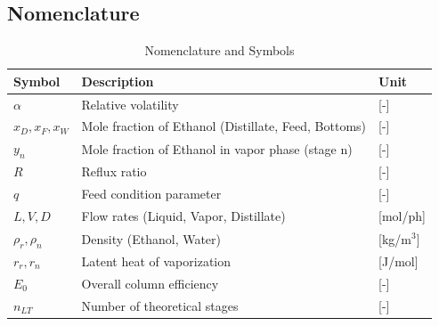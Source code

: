 \subsection{Nomenclature}

\begin{table}[H]
    \centering
    \caption{Nomenclature and Symbols}
    \begin{tabular}{lll}
        \toprule
        \textbf{Symbol}  & \textbf{Description}                                 & \textbf{Unit} \\
        \midrule
        $\alpha$         & Relative volatility                                  & [-]           \\
        $x_D, x_F, x_W$  & Mole fraction of Ethanol (Distillate, Feed, Bottoms) & [-]           \\
        $y_n$            & Mole fraction of Ethanol in vapor phase (stage n)    & [-]           \\
        $R$              & Reflux ratio                                         & [-]           \\
        $q$              & Feed condition parameter                             & [-]           \\
        $L, V, D$        & Flow rates (Liquid, Vapor, Distillate)               & [mol/ph]      \\
        $\rho_r, \rho_n$ & Density (Ethanol, Water)                             & [kg/m$^3$]    \\
        $r_r, r_n$       & Latent heat of vaporization                          & [J/mol]       \\
        $E_0$            & Overall column efficiency                            & [-]           \\
        $n_{LT}$         & Number of theoretical stages                         & [-]           \\
        \bottomrule
    \end{tabular}
\end{table}
